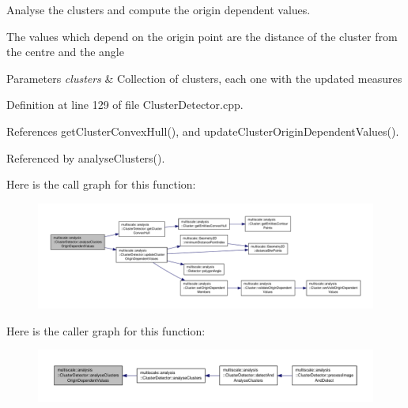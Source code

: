 Analyse the clusters and compute the origin dependent values. 

The values which depend on the origin point are the distance of the cluster from the centre and the angle


\begin{DoxyParams}{Parameters}
{\em clusters} & Collection of clusters, each one with the updated measures \\
\hline
\end{DoxyParams}


Definition at line 129 of file Cluster\-Detector.\-cpp.



References get\-Cluster\-Convex\-Hull(), and update\-Cluster\-Origin\-Dependent\-Values().



Referenced by analyse\-Clusters().



Here is the call graph for this function\-:
\nopagebreak
\begin{figure}[H]
\begin{center}
\leavevmode
\includegraphics[width=350pt]{classmultiscale_1_1analysis_1_1ClusterDetector_affff27bd4559d1272913ff1bceb229b5_cgraph}
\end{center}
\end{figure}




Here is the caller graph for this function\-:
\nopagebreak
\begin{figure}[H]
\begin{center}
\leavevmode
\includegraphics[width=350pt]{classmultiscale_1_1analysis_1_1ClusterDetector_affff27bd4559d1272913ff1bceb229b5_icgraph}
\end{center}
\end{figure}


